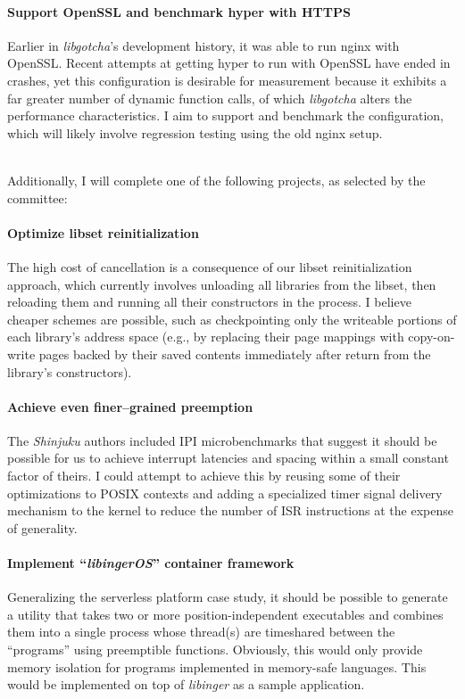\documentclass[12pt,letterpaper,openright]{report}
\begin{document}
\paragraph{Support OpenSSL and benchmark hyper with HTTPS}
Earlier in \textit{libgotcha}'s development history, it was able to run nginx with
OpenSSL.  Recent attempts at getting hyper to run with OpenSSL have ended in crashes,
yet this configuration is desirable for measurement because it exhibits a far greater
number of dynamic function calls, of which \textit{libgotcha} alters the performance
characteristics.  I aim to support and benchmark the configuration, which will likely
involve regression testing using the old nginx setup.

\hfill \\
\noindent
Additionally, I will complete one of the following projects, as selected by the
committee:

\paragraph{Optimize libset reinitialization}
The high cost of cancellation is a consequence of our libset reinitialization
approach, which currently involves unloading all libraries from the libset, then
reloading them and running all their constructors in the process.  I believe cheaper
schemes are possible, such as checkpointing only the writeable portions of each
library's address space (e.g., by replacing their page mappings with copy-on-write
pages backed by their saved contents immediately after return from the library's
constructors).

\paragraph{Achieve even finer--grained preemption}
The \textit{Shinjuku} authors included IPI microbenchmarks that suggest it should be
possible for us to achieve interrupt latencies and spacing within a small constant
factor of theirs.  I could attempt to achieve this by reusing some of their
optimizations to POSIX contexts and adding a specialized timer signal delivery
mechanism to the kernel to reduce the number of ISR instructions at the expense of
generality.

\paragraph{Implement ``\textit{libingerOS}'' container framework}
Generalizing the serverless platform case study, it should be possible to generate a
utility that takes two or more position-independent executables and combines them
into a single process whose thread(s) are timeshared between the ``programs'' using
preemptible functions.  Obviously, this would only provide memory isolation for
programs implemented in memory-safe languages.  This would be implemented on top of
\textit{libinger} as a sample application.
\end{document}
